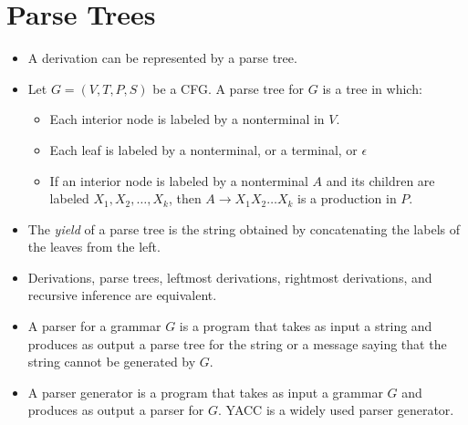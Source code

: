 \documentclass[]{article}
\begin{document}
\section{Parse Trees}
  \begin{itemize}
    \item A derivation can be represented by a parse tree.
    \item Let $G = (V, T, P, S)$ be a CFG. A parse tree for $G$ is a tree in
    which:
      \begin{itemize}
        \item Each interior node is labeled by a nonterminal in $V$.
        \item Each leaf is labeled by a nonterminal, or a terminal, or
        $\epsilon$
        \item If an interior node is labeled by a nonterminal $A$ and its 
        children are labeled $X_1,X_2,\ldots,X_k$, then $A \rightarrow 
        X_1X_2\ldots{X_k}$ is a production in $P$.
      \end{itemize}
    \item The \emph{yield} of a parse tree is the string obtained by
    concatenating the labels of the leaves from the left.
    \item Derivations, parse trees, leftmost derivations, rightmost derivations,
    and recursive inference are equivalent.
    \item A parser for a grammar $G$ is a program that takes as input a string
    and produces as output a parse tree for the string or a message saying that
    the string cannot be generated by $G$.
    \item A parser generator is a program that takes as input a grammar $G$ and
    produces as output a parser for $G$. YACC is a widely used parser generator.
  \end{itemize}
\end{document}
